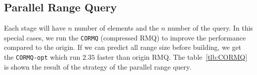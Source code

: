 

\subsection{Parallel Range Query}

Each stage will have $n$ number of elements and the $n$ number of the
query.  In this special cases, we run the {\tt CORMQ} (compressed RMQ)
to improve the performance compared to the origin.  If we can predict
all range size before building, we get the {\tt CORMQ-opt} which run
$2.35$ faster than origin RMQ.  The table~\ref{tlb:CORMQ} is shown the
result of the strategy of the parallel range query.

\iffalse
每一次有 $n$ 個元素和 $n$ 組詢問，針對這種特殊性質的問題，
我們運行樸素的 \texttt{CORMQ} (compressed RMQ) 得到效能改善，
搭配可預測的分析降低運算量 (參照 \texttt{CORMQ-opt})，得到更好的改善。
在 \texttt{CORMQ-opt} 策略中，得到 $2.35 \times$ 倍的加速，結果如表 ~\ref{tlb:CORMQ}。
\fi



